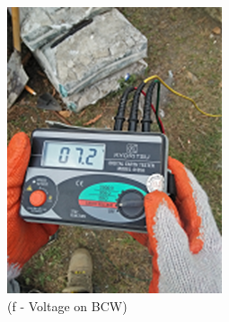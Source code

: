 \begin{figure}[!h]
\begin{minipage}[b]{0.3\linewidth}
	\includegraphics[width=\textwidth]{figures/fig_ch04_elecaudit_grounding_bcw}
	\caption*{(f - Voltage on BCW)}
\end{minipage}
	\hspace{0.03cm}
\begin{minipage}[b]{0.3\linewidth}
	\centering

\end{minipage}
\end{figure}
